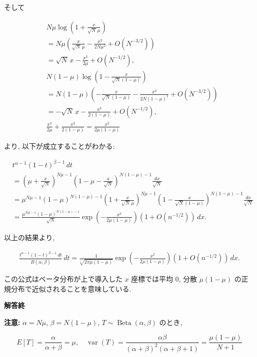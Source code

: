 \documentclass[10pt, a4paper,xelatex,ja=standard]{bxjsarticle}
\newcommand\op{\operatorname}
\begin{document}
そして

\[
\begin{aligned}
&
N\mu\log\left(1+\frac{x}{\sqrt{N}\,\mu}\right)
\\ &=
N\mu\left(\frac{x}{\sqrt{N}\,\mu} - \frac{x^2}{2N\mu^2} + O(N^{-3/2})\right)
\\ &=
\sqrt{N}\,x - \frac{x^2}{2\mu} + O(N^{-1/2}),
\\ &
N(1-\mu)\log\left(1-\frac{x}{\sqrt{N}(1-\mu)}\right) 
\\ &=
N(1-\mu)\left(-\frac{x}{\sqrt{N}(1-\mu)} - \frac{x^2}{2N(1-\mu)^2} + O(N^{-3/2})\right)
\\ &= -
\sqrt{N}\,x - \frac{x^2}{2(1-\mu)} + O(N^{-1/2}),
\\ &
\frac{x^2}{2\mu} + \frac{x^2}{2(1-\mu)} = \frac{x^2}{2\mu(1-\mu)}
\end{aligned}
\]

より, 以下が成立することがわかる:

\[
\begin{aligned}
&
t^{\alpha-1}(1-t)^{\beta-1}\,dt
\\ &=
\left(\mu + \frac{x}{\sqrt{N}}\right)^{N\mu-1}
\left(1 - \mu - \frac{x}{\sqrt{N}}\right)^{N(1-\mu)-1}
\frac{dx}{\sqrt{N}}
\\ &=
\mu^{N\mu-1} (1-\mu)^{N(1-\mu)-1}
\left(1+\frac{x}{\sqrt{N}\,\mu}\right)^{N\mu-1}
\left(1-\frac{x}{\sqrt{N}(1-\mu)}\right) ^{N(1-\mu)-1}
\frac{dx}{\sqrt{N}}
\\ &=
\frac{\mu^{N\mu-1} (1-\mu)^{N(1-\mu)-1}}{\sqrt{N}}
\exp\left(-\frac{x^2}{2\mu(1-\mu)}\right) (1 + O(n^{-1/2}))
\,dx.
\end{aligned}
\]

以上の結果より,

\[
\begin{aligned}
\frac{t^{\alpha-1}(1-t)^{\beta-1}\,dt}{B(\alpha,\beta)}\,dt =
\frac{1}{\sqrt{2\pi\mu(1-\mu)}}
\exp\left(-\frac{x^2}{2\mu(1-\mu)}\right) (1 + O(n^{-1/2}))
\,dx.
\end{aligned}
\]

この公式はベータ分布が上で導入した \(x\) 座標では平均 \(0\), 分散
\(\mu(1-\mu)\) の正規分布で近似されることを意味している.

\textbf{解答終}

\textbf{注意:} \(\alpha = N\mu\), \(\beta = N(1-\mu)\),
\(T\sim\op{Beta}(\alpha,\beta)\) のとき,

\[
E[T] = \frac{\alpha}{\alpha+\beta} = \mu, \quad
\op{var}(T) =
\frac{\alpha\beta}{(\alpha+\beta)^2(\alpha+\beta+1)} =
\frac{\mu(1-\mu)}{N+1}
\]
\end{document}
